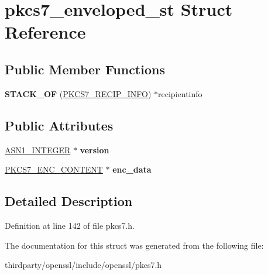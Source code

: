 \hypertarget{structpkcs7__enveloped__st}{}\section{pkcs7\+\_\+enveloped\+\_\+st Struct Reference}
\label{structpkcs7__enveloped__st}
\subsection*{Public Member Functions}
\begin{DoxyCompactItemize}
\item 
\mbox{\label{structpkcs7__enveloped__st_a6f6e261d3e4685a25ad6db96689155a1}} 
{\bfseries S\+T\+A\+C\+K\+\_\+\+OF} (\hyperlink{structpkcs7__recip__info__st}{P\+K\+C\+S7\+\_\+\+R\+E\+C\+I\+P\+\_\+\+I\+N\+FO}) $\ast$recipientinfo
\end{DoxyCompactItemize}
\subsection*{Public Attributes}
\begin{DoxyCompactItemize}
\item 
\mbox{\label{structpkcs7__enveloped__st_ae2f1117cfce2ed9ac25db876eea35c74}} 
\hyperlink{structasn1__string__st}{A\+S\+N1\+\_\+\+I\+N\+T\+E\+G\+ER} $\ast$ {\bfseries version}
\item 
\mbox{\label{structpkcs7__enveloped__st_a70fb3ace75518cf782f9e0330f4a140e}} 
\hyperlink{structpkcs7__enc__content__st}{P\+K\+C\+S7\+\_\+\+E\+N\+C\+\_\+\+C\+O\+N\+T\+E\+NT} $\ast$ {\bfseries enc\+\_\+data}
\end{DoxyCompactItemize}


\subsection{Detailed Description}


Definition at line 142 of file pkcs7.\+h.



The documentation for this struct was generated from the following file\+:\begin{DoxyCompactItemize}
\item 
thirdparty/openssl/include/openssl/pkcs7.\+h\end{DoxyCompactItemize}
